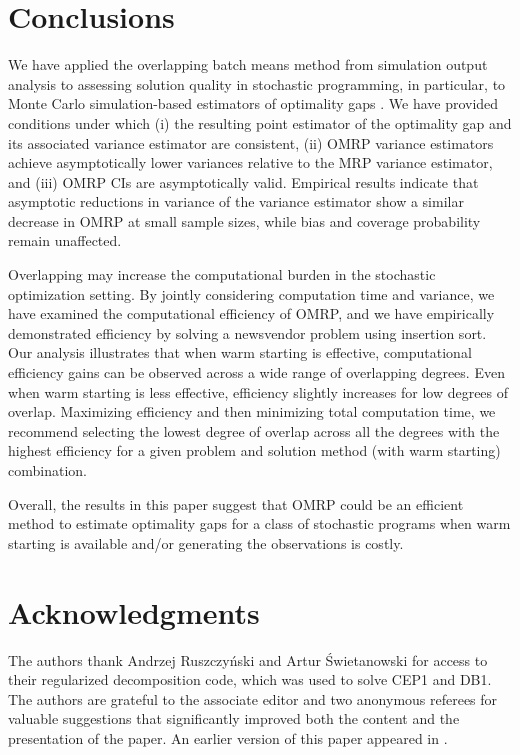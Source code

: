 \documentclass[12pt]{article}
\begin{document}
\section{Conclusions}
\label{sec:concl}

We have applied the overlapping batch means method from simulation output analysis \citep{Meketon1984,Song1992,Welch1987} to assessing solution quality in stochastic programming, in particular, to Monte Carlo simulation-based estimators of optimality gaps \citep{Mak1999}. 
We have provided conditions under which (i) the resulting point estimator of the optimality gap and its associated variance estimator are consistent, (ii) OMRP variance estimators achieve asymptotically lower variances relative to the MRP variance estimator, and (iii) OMRP CIs are asymptotically valid. 
Empirical results indicate that asymptotic reductions in variance of the variance estimator show a similar decrease in OMRP at small sample sizes, while bias and coverage probability remain unaffected. 

Overlapping may increase the computational burden in the stochastic optimization setting.
By jointly considering computation time and variance, we have examined the computational efficiency of OMRP, and we have empirically demonstrated  efficiency by solving a newsvendor problem using insertion sort.
Our analysis illustrates that when warm starting is effective, computational efficiency gains can be observed across a wide range of overlapping degrees.
Even when warm starting is less effective, efficiency slightly increases for low degrees of overlap. 
Maximizing efficiency and then minimizing total computation time, we recommend  selecting the lowest degree of overlap across all the degrees with the highest efficiency for a given problem and solution method (with warm starting) combination. 


Overall, the results in this paper suggest that OMRP could be an efficient method to estimate optimality gaps for a class of stochastic programs when warm starting is available and/or generating the observations is costly.
 

\section*{Acknowledgments}
The authors thank Andrzej Ruszczy{\'{n}}ski and Artur {\'{S}}wietanowski for
access to their regularized decomposition code, which was used to solve CEP1 and DB1. 
The authors are grateful to the associate editor and two anonymous referees for valuable suggestions that significantly improved both the content and the presentation of the paper. 
An earlier version of this paper appeared in \citep{love2011overlapping}.



\end{document}
